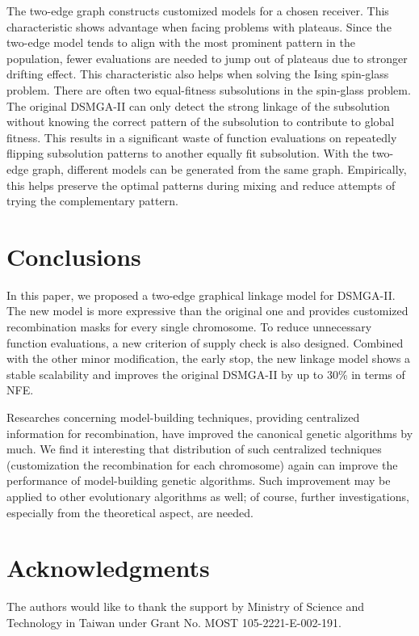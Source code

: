 \documentclass{sig-alternate-05-2015}
\begin{document}
The two-edge graph constructs customized models for a chosen receiver. 
This characteristic shows advantage when facing problems with plateaus.
Since the two-edge model tends to align with the most prominent pattern in the population, fewer evaluations are needed to jump out of plateaus due to stronger drifting effect. This characteristic also helps when solving the Ising spin-glass problem. 
There are often two equal-fitness subsolutions in the spin-glass problem.
The original DSMGA-II can only detect the strong linkage of the subsolution without knowing the correct pattern of the subsolution to contribute to global fitness.
This results in a significant waste of function evaluations on repeatedly flipping subsolution patterns to another equally fit subsolution.
With the two-edge graph, different models can be generated from the same graph. 
Empirically, this helps preserve the optimal patterns during mixing and reduce attempts of trying the complementary pattern.



\section{Conclusions}
 
In this paper, we proposed a two-edge graphical linkage model for DSMGA-II. 
The new model is more expressive than the original one and provides customized recombination masks for every single chromosome. 
To reduce unnecessary function evaluations, a new criterion of supply check  is also designed. Combined with the other minor modification, the early stop, the new linkage model shows a stable scalability and improves the original DSMGA-II by up to 30\% in terms of NFE.



Researches concerning model-building techniques, providing centralized information for recombination, have improved the canonical genetic algorithms by much. 
We find it interesting that distribution of such centralized techniques (customization the recombination for each chromosome) again can improve the performance of model-building genetic algorithms. 
Such improvement may be applied to other evolutionary algorithms as well; of course,  further investigations, especially from the theoretical aspect, are needed.  



\section{Acknowledgments}
The authors would like to thank the support by Ministry of Science and Technology in Taiwan under Grant No. MOST 105-2221-E-002-191.
\end{document}
